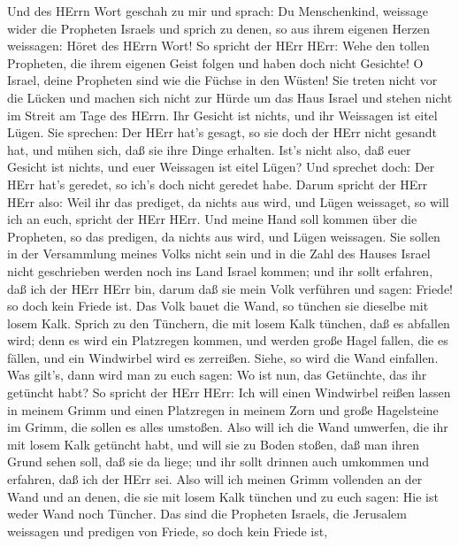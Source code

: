  Und des HErrn Wort geschah zu mir und sprach: 
Du Menschenkind, weissage wider die Propheten Israels und sprich zu
denen, so aus ihrem eigenen Herzen weissagen: Höret des HErrn Wort!
 So spricht der HErr HErr: Wehe den tollen Propheten, die
ihrem eigenen Geist folgen und haben doch nicht Gesichte!  O
Israel, deine Propheten sind wie die Füchse in den Wüsten! 
Sie treten nicht vor die Lücken und machen sich nicht zur Hürde um das
Haus Israel und stehen nicht im Streit am Tage des HErrn. 
Ihr Gesicht ist nichts, und ihr Weissagen ist eitel Lügen. Sie sprechen:
Der HErr hat's gesagt, so sie doch der HErr nicht gesandt hat, und mühen
sich, daß sie ihre Dinge erhalten.  Ist's nicht also, daß
euer Gesicht ist nichts, und euer Weissagen ist eitel Lügen? Und
sprechet doch: Der HErr hat's geredet, so ich's doch nicht geredet habe.
 Darum spricht der HErr HErr also: Weil ihr das prediget, da
nichts aus wird, und Lügen weissaget, so will ich an euch, spricht der
HErr HErr.  Und meine Hand soll kommen über die Propheten,
so das predigen, da nichts aus wird, und Lügen weissagen. Sie sollen in
der Versammlung meines Volks nicht sein und in die Zahl des Hauses
Israel nicht geschrieben werden noch ins Land Israel kommen; und ihr
sollt erfahren, daß ich der HErr HErr bin,  darum daß sie
mein Volk verführen und sagen: Friede! so doch kein Friede ist. Das Volk
bauet die Wand, so tünchen sie dieselbe mit losem Kalk. 
Sprich zu den Tünchern, die mit losem Kalk tünchen, daß es abfallen
wird; denn es wird ein Platzregen kommen, und werden große Hagel fallen,
die es fällen, und ein Windwirbel wird es zerreißen. 
Siehe, so wird die Wand einfallen. Was gilt's, dann wird man zu euch
sagen: Wo ist nun, das Getünchte, das ihr getüncht habt? 
So spricht der HErr HErr: Ich will einen Windwirbel reißen lassen in
meinem Grimm und einen Platzregen in meinem Zorn und große Hagelsteine
im Grimm, die sollen es alles umstoßen.  Also will ich die
Wand umwerfen, die ihr mit losem Kalk getüncht habt, und will sie zu
Boden stoßen, daß man ihren Grund sehen soll, daß sie da liege; und ihr
sollt drinnen auch umkommen und erfahren, daß ich der HErr sei.
 Also will ich meinen Grimm vollenden an der Wand und an
denen, die sie mit losem Kalk tünchen und zu euch sagen: Hie ist weder
Wand noch Tüncher.  Das sind die Propheten Israels, die
Jerusalem weissagen und predigen von Friede, so doch kein Friede ist,
